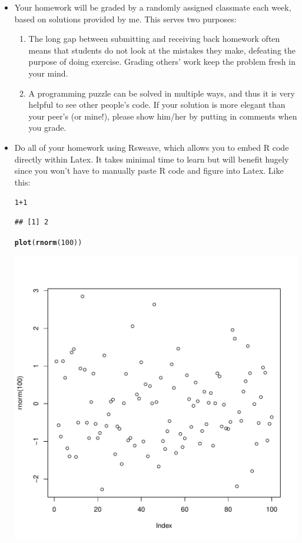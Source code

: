 \documentclass{article}\usepackage[]{graphicx}\usepackage[]{color}
\makeatletter
\def\maxwidth{ %
  \ifdim\Gin@nat@width>\linewidth
    \linewidth
  \else
    \Gin@nat@width
  \fi
}
\newcommand{\hlnum}[1]{\textcolor[rgb]{0.686,0.059,0.569}{#1}}%
\newcommand{\hlopt}[1]{\textcolor[rgb]{0,0,0}{#1}}%
\newcommand{\hlstd}[1]{\textcolor[rgb]{0.345,0.345,0.345}{#1}}%
\newcommand{\hlkwd}[1]{\textcolor[rgb]{0.737,0.353,0.396}{\textbf{#1}}}%
\newenvironment{kframe}{%
 \def\at@end@of@kframe{}%
 \ifinner\ifhmode%
  \def\at@end@of@kframe{\end{minipage}}%
  \begin{minipage}{\columnwidth}%
 \fi\fi%
 \def\FrameCommand##1{\hskip\@totalleftmargin \hskip-\fboxsep
 \colorbox{shadecolor}{##1}\hskip-\fboxsep
     \hskip-\linewidth \hskip-\@totalleftmargin \hskip\columnwidth}%
 \MakeFramed {\advance\hsize-\width
   \@totalleftmargin\z@ \linewidth\hsize
   \@setminipage}}%
 {\par\unskip\endMakeFramed%
 \at@end@of@kframe}
\newenvironment{knitrout}{}{} %
\makeatother
\begin{document}
\begin{itemize}
\item Your homework will be graded by a randomly assigned classmate each week, based on solutions provided by me. This serves two purposes:
  \begin{enumerate}
    \item The long gap between submitting and receiving back homework often means that students do not look at the mistakes they make, defeating the purpose of doing exercise. Grading others' work keep the problem fresh in your mind.
    \item A programming puzzle can be solved in multiple ways, and thus it is very helpful to see other people's code. If your solution is more elegant than your peer's (or mine!), please show him/her by putting in comments when you grade.
\end{enumerate}
\item Do all of your homework using Rsweave, which allows you to embed R code directly within Latex. It takes minimal time to learn but will benefit hugely since you won't have to manually paste R code and figure into Latex. Like this:

\begin{knitrout}
\color{fgcolor}\begin{kframe}
\begin{alltt}
\hlnum{1} \hlopt{+} \hlnum{1}
\end{alltt}
\begin{verbatim}
## [1] 2
\end{verbatim}
\begin{alltt}
\hlkwd{plot}\hlstd{(}\hlkwd{rnorm}\hlstd{(}\hlnum{100}\hlstd{))}
\end{alltt}
\end{kframe}
\includegraphics[width=\maxwidth]{figure/unnamed-chunk-1} 


\end{knitrout}
\end{itemize}
\end{document}
